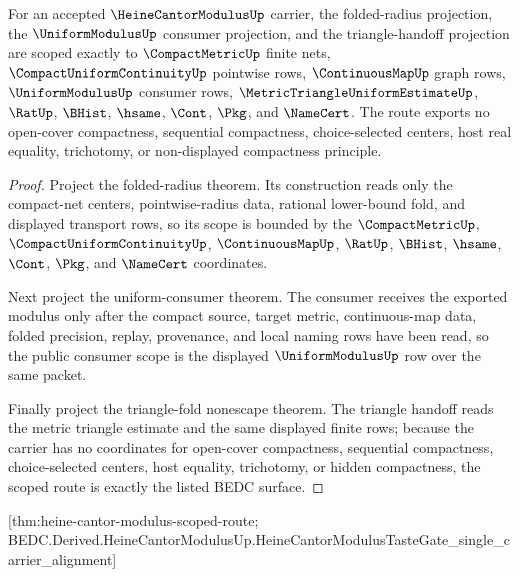 \begin{theorem}
\label{thm:heine-cantor-modulus-scoped-route}
For an accepted $\HeineCantorModulusUp$ carrier, the folded-radius projection, the $\UniformModulusUp$ consumer projection, and the triangle-handoff projection are scoped exactly to $\CompactMetricUp$ finite nets, $\CompactUniformContinuityUp$ pointwise rows, $\ContinuousMapUp$ graph rows, $\UniformModulusUp$ consumer rows, $\MetricTriangleUniformEstimateUp$, $\RatUp$, $\BHist$, $\hsame$, $\Cont$, $\Pkg$, and $\NameCert$. The route exports no open-cover compactness, sequential compactness, choice-selected centers, host real equality, trichotomy, or non-displayed compactness principle.
\end{theorem}
\begin{proof}
Project the folded-radius theorem. Its construction reads only the compact-net centers, pointwise-radius data, rational lower-bound fold, and displayed transport rows, so its scope is bounded by the $\CompactMetricUp$, $\CompactUniformContinuityUp$, $\ContinuousMapUp$, $\RatUp$, $\BHist$, $\hsame$, $\Cont$, $\Pkg$, and $\NameCert$ coordinates.

Next project the uniform-consumer theorem. The consumer receives the exported modulus only after the compact source, target metric, continuous-map data, folded precision, replay, provenance, and local naming rows have been read, so the public consumer scope is the displayed $\UniformModulusUp$ row over the same packet.

Finally project the triangle-fold nonescape theorem. The triangle handoff reads the metric triangle estimate and the same displayed finite rows; because the carrier has no coordinates for open-cover compactness, sequential compactness, choice-selected centers, host equality, trichotomy, or hidden compactness, the scoped route is exactly the listed BEDC surface.
\end{proof}

[thm:heine-cantor-modulus-scoped-route; BEDC.Derived.HeineCantorModulusUp.HeineCantorModulusTasteGate\_single\_carrier\_alignment]

